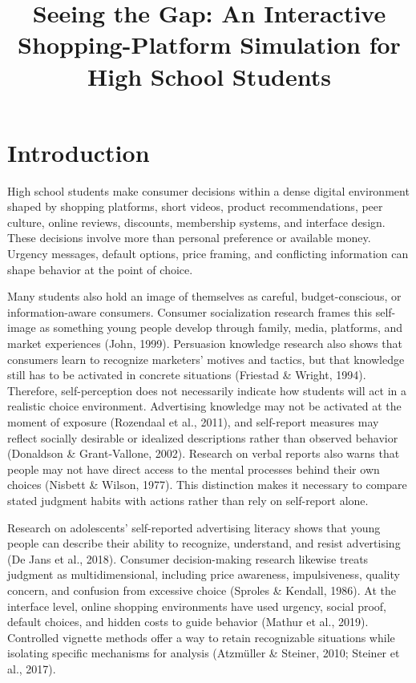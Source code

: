 \documentclass[stu,12pt,floatsintext]{apa7}
\title{Seeing the Gap: An Interactive Shopping-Platform Simulation for High School Students}
\begin{document}
\maketitle

\section{Introduction}

High school students make consumer decisions within a dense digital environment shaped by shopping platforms, short videos, product recommendations, peer culture, online reviews, discounts, membership systems, and interface design. These decisions involve more than personal preference or available money. Urgency messages, default options, price framing, and conflicting information can shape behavior at the point of choice.

Many students also hold an image of themselves as careful, budget-conscious, or information-aware consumers. Consumer socialization research frames this self-image as something young people develop through family, media, platforms, and market experiences (John, 1999). Persuasion knowledge research also shows that consumers learn to recognize marketers' motives and tactics, but that knowledge still has to be activated in concrete situations (Friestad \& Wright, 1994). Therefore, self-perception does not necessarily indicate how students will act in a realistic choice environment. Advertising knowledge may not be activated at the moment of exposure (Rozendaal et al., 2011), and self-report measures may reflect socially desirable or idealized descriptions rather than observed behavior (Donaldson \& Grant-Vallone, 2002). Research on verbal reports also warns that people may not have direct access to the mental processes behind their own choices (Nisbett \& Wilson, 1977). This distinction makes it necessary to compare stated judgment habits with actions rather than rely on self-report alone.

Research on adolescents' self-reported advertising literacy shows that young people can describe their ability to recognize, understand, and resist advertising (De Jans et al., 2018). Consumer decision-making research likewise treats judgment as multidimensional, including price awareness, impulsiveness, quality concern, and confusion from excessive choice (Sproles \& Kendall, 1986). At the interface level, online shopping environments have used urgency, social proof, default choices, and hidden costs to guide behavior (Mathur et al., 2019). Controlled vignette methods offer a way to retain recognizable situations while isolating specific mechanisms for analysis (Atzmüller \& Steiner, 2010; Steiner et al., 2017).
\end{document}
